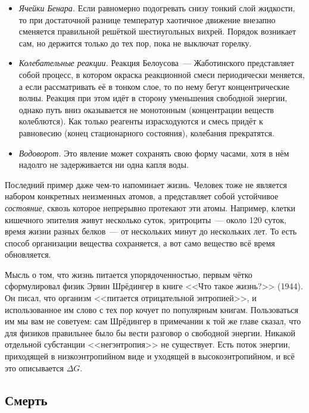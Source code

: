 \begin{itemize}
    \item \emph{Ячейки Бенара.} Если равномерно подогревать снизу тонкий слой жидкости, то при достаточной разнице температур хаотичное движение внезапно сменяется правильной решёткой шестиугольных вихрей. Порядок возникает сам, но держится только до тех пор, пока не выключат горелку.
    \item \emph{Колебательные реакции.} Реакция Белоусова~--- Жаботинского представляет собой процесс, в котором окраска реакционной смеси периодически меняется, а если рассматривать её в тонком слое, то по нему бегут концентрические волны. Реакция при этом идёт в сторону уменьшения свободной энергии, однако путь вниз оказывается не монотонным (концентрации веществ колеблются). Как только реагенты израсходуются и смесь придёт к равновесию (конец стационарного состояния), колебания прекратятся.
    \item \emph{Водоворот.} Это явление может сохранять свою форму часами, хотя в нём надолго не задерживается ни одна капля воды.
\end{itemize}

Последний пример даже чем-то напоминает жизнь. Человек тоже не является набором конкретных неизменных атомов, а представляет собой устойчивое \emph{состояние}, сквозь которое непрерывно протекают эти атомы. Например, клетки кишечного эпителия живут несколько суток, эритроциты~--- около \num{120} суток, время жизни разных белков~--- от нескольких минут до нескольких лет. То есть способ организации вещества сохраняется, а вот само вещество всё время обновляется.

Мысль о том, что жизнь питается упорядоченностью, первым чётко сформулировал физик Эрвин Шрёдингер в книге <<Что такое жизнь?>> (\num{1944}). Он писал, что организм <<питается отрицательной энтропией>>, и использованное им слово  с тех пор кочует по популярным книгам. Пользоваться им мы вам не советуем: сам Шрёдингер в примечании к той же главе сказал, что для физиков правильнее было бы вести разговор о свободной энергии. Никакой отдельной субстанции <<негэнтропия>> не существует. Есть поток энергии, приходящей в низкоэнтропийном виде и уходящей в высокоэнтропийном, и всё это описывается $\Delta G$.

\subsection*{Смерть}


